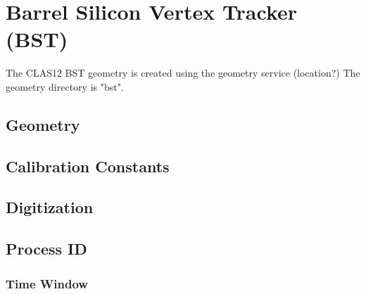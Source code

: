 \section{Barrel Silicon Vertex Tracker (BST)}

The CLAS12 BST geometry is created using the geometry service (location?)
The geometry directory is "bst".


\subsection{Geometry}

\subsection{Calibration Constants}

\subsection{Digitization}

\subsection{Process ID}

\subsubsection{Time Window}
